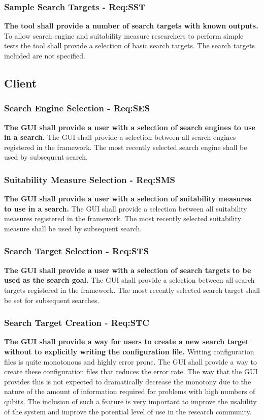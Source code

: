 \subsubsection{Sample Search Targets - Req:SST}
\label{sec:reqsst}
\textbf{The tool shall provide a number of search targets with known outputs.}
To allow search engine and suitability measure researchers to perform simple tests the tool shall provide a selection of basic search targets.
The search targets included are not specified.

\subsection{Client}
\label{sec:clientguireqs}

\subsubsection{Search Engine Selection - Req:SES}
\label{sec:reqses}
\textbf{The GUI shall provide a user with a selection of search engines to use in a search.}
The GUI shall provide a selection between all search engines registered in the framework.
The most recently selected search engine shall be used by subsequent search.

\subsubsection{Suitability Measure Selection - Req:SMS}
\label{sec:reqsms}
\textbf{The GUI shall provide a user with a selection of suitability measures to use in a search.}
The GUI shall provide a selection between all suitability measures registered in the framework.
The most recently selected suitability measure shall be used by subsequent search.

\subsubsection{Search Target Selection - Req:STS}
\label{sec:reqsts}
\textbf{The GUI shall provide a user with a selection of search targets to be used as the search goal.}
The GUI shall provide a selection between all search targets registered in the framework.
The most recently selected search target shall be set for subsequent searches.

\subsubsection{Search Target Creation - Req:STC}
\label{sec:reqstc}
\textbf{The GUI shall provide a way for users to create a new search target without to explicitly writing the configuration file.}
Writing configuration files is quite monotonous and highly error prone.
The GUI shall provide a way to create these configuration files that reduces the error rate.
The way that the GUI provides this is not expected to dramatically decrease the monotony due to the nature of the amount of information required for problems with high numbers of qubits.
The inclusion of such a feature is very important to improve the usability of the system and improve the potential level of use in the research community.


